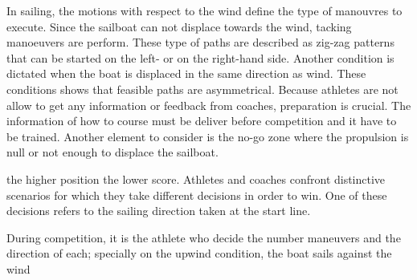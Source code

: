 In sailing, the motions with respect to the wind define the type of manouvres to execute.  Since the sailboat can not displace towards the wind, tacking manoeuvers are perform. These type of paths are described as zig-zag patterns that can be started on the left- or on the right-hand side. Another condition is dictated when the boat is displaced in the same direction as wind. These conditions shows that feasible paths are asymmetrical\cite{dolinskaya2012optimal}. Because athletes are not allow to get any information or feedback from coaches, preparation is crucial. The information of how to course must be deliver before competition and it have to be trained. Another element to consider is the no-go zone where the propulsion is null or not enough to displace the sailboat\cite{yang2011control}.\par
\newpage
\newpage
the higher position the lower score. Athletes and coaches confront distinctive scenarios for which they take different decisions in order to win. One of these decisions refers to the sailing direction taken at the start line.

During competition, it is the athlete who decide the number maneuvers and the direction of each; specially on the upwind condition, the boat sails against the wind


